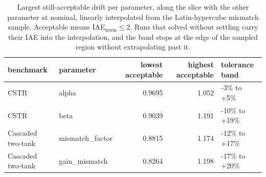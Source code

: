 \begin{table}
\caption{Largest still-acceptable drift per parameter, along the slice with the other parameter at nominal, linearly interpolated from the Latin-hypercube mismatch sample. Acceptable means IAE$_{\mathrm{norm}} \le 2$. Runs that solved without settling carry their IAE into the interpolation, and the band stops at the edge of the sampled region without extrapolating past it.}
\label{tab:T3_tolerance_summary}
\begin{tabular}{llrrl}
\toprule
benchmark & parameter & lowest acceptable & highest acceptable & tolerance band \\
\midrule
CSTR & alpha & 0.9695 & 1.052 & -3\% to +5\% \\
CSTR & beta & 0.9039 & 1.191 & -10\% to +19\% \\
Cascaded two-tank & mismatch\_factor & 0.8815 & 1.174 & -12\% to +17\% \\
Cascaded two-tank & gain\_mismatch & 0.8264 & 1.198 & -17\% to +20\% \\
\bottomrule
\end{tabular}
\end{table}
